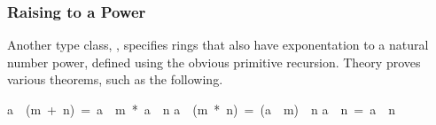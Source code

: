 \subsubsection{Raising to a Power}

Another type class, , specifies rings that also have
exponentation to a natural number power, defined using the obvious primitive
recursion. Theory  proves various theorems, such as the
following.
\begin{isabelle}
a\ \isacharcircum \ (m\ +\ n)\ =\ a\ \isacharcircum \ m\ *\ a\ \isacharcircum \ n%
\isanewline
a\ \isacharcircum \ (m\ *\ n)\ =\ (a\ \isacharcircum \ m)\ \isacharcircum \ n%
\isanewline
\isasymbar a\ \isacharcircum \ n\isasymbar \ =\ \isasymbar a\isasymbar \ \isacharcircum \ n%
\end{isabelle}%

